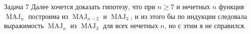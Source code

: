 \documentclass{article}
\DeclareMathOperator{\maj}{MAJ}
\begin{document}
\begin{section}{Задача 7}
		Далее хочется доказать гипотезу, что при $n \ge 7$ и нечетных $n$ функция $\maj_n$ построима из $\maj_{n-2}$ и $\maj_3$, и из этого бы по индукции следовала выражимость $\maj_n$ из $\maj_3$ для всех нечетных $n$, но с этим я не справился.
	\end{section}
\end{document}
